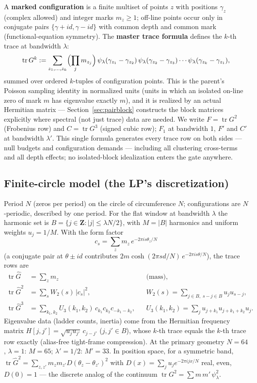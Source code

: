 \documentclass[11pt]{article}
\theoremstyle{plain}
\theoremstyle{definition}
\theoremstyle{remark}
\newcommand{\Z}{\mathbf{Z}}
\newcommand{\Gh}{\widehat{G}}
\newcommand{\tr}{\operatorname{tr}}
\begin{document}
A \textbf{marked configuration} is a finite multiset of points $z$ with positions
$\gamma_z$ (complex allowed) and integer marks $m_z \ge 1$; off-line points occur
only in conjugate pairs $\{\gamma + i d, \gamma - i d\}$ with common depth and
common mark (functional-equation symmetry). The \textbf{master trace formula}
defines the $k$-th trace at bandwidth $\lambda$:
\[
  \tr G^k := \sum_{z_1, \ldots, z_k}
    \Bigl( \prod_j m_{z_j} \Bigr)\,
    \psi_\lambda(\gamma_{z_1} - \gamma_{z_2})\,
    \psi_\lambda(\gamma_{z_2} - \gamma_{z_3}) \cdots
    \psi_\lambda(\gamma_{z_k} - \gamma_{z_1}),
\]
summed over ordered $k$-tuples of configuration points. This is the parent's
Poisson sampling identity in normalized units (units in which an isolated on-line
zero of mark $m$ has eigenvalue exactly $m$), and it is realized by an actual
Hermitian matrix --- Section~\ref{sec:pairblock} constructs the block matrices
explicitly where spectral (not just trace) data are needed. We write
$F = \tr G^2$ (Frobenius row) and $C = \tr G^3$ (signed cubic row); $F_1$ at
bandwidth $1$, $F'$ and $C'$ at bandwidth $\lambda'$. This single formula
generates every trace row on both sides --- null budgets and configuration
demands --- including all clustering cross-terms and all depth effects; no
isolated-block idealization enters the gate anywhere.

\subsection{Finite-circle model (the LP's discretization)}
\label{sec:finitecircle}

Period $N$ (zeros per period) on the circle of circumference $N$; configurations
are $N$-periodic, described by one period. For the flat window at bandwidth
$\lambda$ the harmonic set is $B = \{j \in \Z : |j| \le \lambda N/2\}$, with
$M = |B|$ harmonics and uniform weights $u_j = 1/M$. With the form factor
\[
  c_s = \sum_z m_z\, e^{-2\pi i s \theta_z/N}
\]
(a conjugate pair at $\theta \pm i d$ contributes
$2m \cosh(2\pi s d/N)\, e^{-2\pi i s \theta/N}$), the trace rows are
\begin{align*}
  \tr \Gh &= \sum_z m_z && \text{(mass)},\\
  \tr \Gh^2 &= \sum_s W_2(s)\, |c_s|^2,
    && W_2(s) = \sum_{j \in B,\; s - j \in B} u_j u_{s-j},\\
  \tr \Gh^3 &= \sum_{k_1, k_2} U_3(k_1, k_2)\, c_{k_1} c_{k_2} c_{-k_1-k_2},
    && U_3(k_1, k_2) = \sum_j u_{j+k_1} u_{j+k_1+k_2} u_j .
\end{align*}
Eigenvalue data (ladder counts, inertia) come from the Hermitian frequency matrix
$H[j, j'] = \sqrt{u_j u_{j'}}\, c_{j - j'}$ ($j, j' \in B$), whose $k$-th trace
equals the $k$-th trace row exactly (alias-free tight-frame compression). At the
primary geometry $N = 64$, $\lambda = 1$: $M = 65$; $\lambda' = 1/2$: $M' = 33$.
In position space, for a symmetric band,
$\tr \Gh^2 = \sum_{z, z'} m_z m_{z'} D(\theta_z - \theta_{z'})^2$ with
$D(x) = \sum_j u_j e^{-2\pi i j x/N}$ real, even, $D(0) = 1$ --- the discrete
analog of the continuum $\tr G^2 = \sum m\, m'\, \psi_\lambda^2$.
\end{document}
